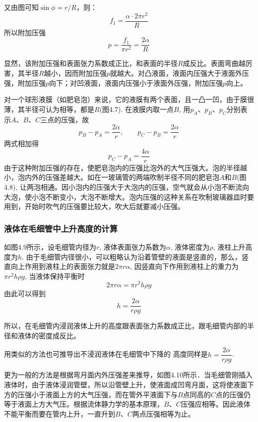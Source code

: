 又由图可知$\sin\phi=r/R$，则：
\[f_1=\frac{\alpha\cdot 2\pi r^2}{R}\]
所以附加压强
\[p=\frac{f_1}{\pi r^2}=\frac{2\alpha}{R}\]

显然，该附加压强和表面张力系数成正比，和表面的半径$R$成反比。表面弯曲越厉害，其半径$R$越小，因而附加压强$p$就越大。对凸液面，液面内压强大于液面外压强，附加压强$p$向下；对凹液面，液面内压强小于液面外压强，附加压强$p$向上。

对一个球形液膜（如肥皂泡）来说，它的液膜有两个表面，且一凸一凹，由于膜很薄，其半径可认为相等，都是$R$(图4.7). 在液膜内取一点$B$, 用$p_A$、$p_B$、$p_C$分别表示$A$、$B$、$C$三点的压强，故
\[p_B-p_A=\frac{2\alpha}{r},\qquad p_C-p_B=\frac{2\alpha}{r}\]
两式相加得
\[p_C-p_A=\frac{4\alpha}{r}\]
由于这种附加压强的存在，使肥皂泡内的压强比泡外的大气压强大。泡的半径越小，泡内外的压强差越大。如在一玻璃管的两端吹制半径不同的肥皂泡$A$和$B$(图4.8), 让两泡相通。因小泡内的压强大于大泡内的压强，空气就会从小泡不断流向大泡，使小泡不断变小，大泡不断增大。泡内压强的这种关系在吹制玻璃器皿时要用到，开始时吹气的压强要比较大，吹大后就要减小压强。

\begin{figure}[htp]
    \centering
    \caption{}
\end{figure}

\subsubsection{液体在毛细管中上升高度的计算}


如图4.9所示，设毛细管内径为$r$, 液体表面张力系数为$\alpha$, 液体密度为$\rho$, 液柱上升高度为$h$. 由于毛细管内径很小，可以粗略认为沿着管壁的液面是竖直的，那么，竖直向上作用到液柱上的表面张力就是$2\pi r\alpha$, 因竖直向下作用到液柱上的重力为$\pi r^2h\rho g$, 当液体保持平衡时
\[2\pi r\alpha=\pi r^2h\rho g\]
由此可以得到
\[h=\frac{2\alpha}{r\rho g}\]

\begin{figure}[htp]
    \centering
    \caption{}
\end{figure}

所以，在毛细管内浸润液体上升的高度跟表面张力系数成正比，跟毛细管内部的半径和液体的密度成反比。

用类似的方法也可推导出不浸润液体在毛细管中下降的
高度同样是$h=\dfrac{2\alpha}{r\rho g}$.

更为一般的方法是根据弯月面内外压强差来推导，如图4.10所示．当毛细管刚插入液体时，由于液体浸润管壁，所以沿管壁上升，使液面成凹弯月面，这将使液面下方的压强小于液面上方的大气压强，而在管外平液面下与$B$点同高的$C$点的压强仍等于液面上方大气压。根据流体静力学的基本原理，$B$、$C$压强应相等。因此液体不能平衡而要在管内上升，一直升到$B$、$C$两点压强相等为止。


